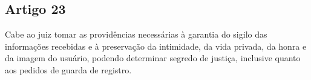 \subsection{Artigo 23}
Cabe ao juiz tomar as providências necessárias à garantia do sigilo das informações recebidas e à preservação da intimidade, da vida privada, da honra e da imagem do usuário, podendo determinar segredo de justiça, inclusive quanto aos pedidos de guarda de registro.